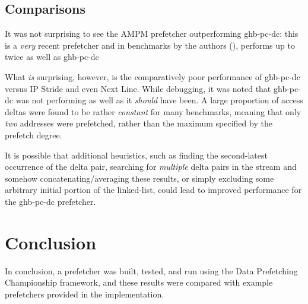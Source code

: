 \documentclass[multicol,date,tikzlibs,minted,ieeebib,bibtex]{epreport}
\begin{document}
\begin{multicols}{2}
	\subsection{Comparisons}
	It was not surprising to see the AMPM prefetcher outperforming \gls{ghb-pc-dc}: this is a \emph{very} recent prefetcher and in benchmarks by the authors (\citeauthor{ishiiAccessMapPattern2011}), performs up to twice as well as \gls{ghb-pc-dc}\cite{ishiiAccessMapPattern2011}

	What \emph{is} surprising, however, is the comparatively poor performance of \gls{ghb-pc-dc} versus IP Stride and even Next Line.
	While debugging, it was noted that \gls{ghb-pc-dc} was not performing as well as it \emph{should} have been.
	A large proportion of access deltas were found to be rather \emph{constant} for many benchmarks, meaning that only \emph{two} addresses were prefetched, rather than the maximum specified by the prefetch degree.

	It is possible that additional heuristics, such as finding the second-latest occurrence of the delta pair, searching for \emph{multiple} delta pairs in the stream and somehow concatenating/averaging these results, or simply excluding some arbitrary initial portion of the linked-list, could lead to improved performance for the \gls{ghb-pc-dc} prefetcher.

	\section{Conclusion}
	In conclusion, a  prefetcher was built, tested, and run using the Data Prefetching Championship framework, and these results were compared with example prefetchers provided in the implementation.
\end{multicols}

\printbibliography{}
\end{document}
